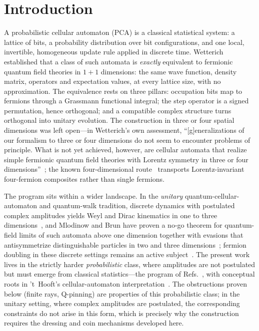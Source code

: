 \documentclass[aps,prd,twocolumn,superscriptaddress,nofootinbib,floatfix]{revtex4-2}
\begin{document}
\section{Introduction}
\label{sec:intro}

A probabilistic cellular automaton (PCA) is a classical statistical system:
a lattice of bits, a probability distribution over bit configurations, and
one local, invertible, homogeneous update rule applied in discrete time.
Wetterich~\cite{Wetterich2022,Wetterich2022b} established that a class of
such automata is \emph{exactly} equivalent to fermionic quantum field
theories in $1+1$ dimensions: the same wave function, density matrix,
operators and expectation values, at every lattice size, with no
approximation. The equivalence rests on three pillars: occupation bits map
to fermions through a Grassmann functional integral; the step operator is a
signed permutation, hence orthogonal; and a compatible complex structure
turns orthogonal into unitary evolution. The construction in three or four
spatial dimensions was left open---in Wetterich's own assessment,
``[g]eneralizations of our formalism to three or four dimensions do
not seem to encounter problems of principle. What is not yet achieved,
however, are cellular automata that realize simple fermionic quantum
field theories with Lorentz symmetry in three or four
dimensions''~\cite{Wetterich2022}; the known four-dimensional
route~\cite{Wetterich2022c} transports Lorentz-invariant four-fermion
composites rather than single fermions.

The program sits within a wider landscape. In the \emph{unitary}
quantum-cellular-automaton and quantum-walk tradition, discrete dynamics
with postulated complex amplitudes yields Weyl and Dirac kinematics in one
to three dimensions~\cite{BialynickiBirula,Meyer,DArianoPerinotti,
BisioDAriano,Arrighi,Farrelly,Kitagawa}, and Mlodinow and Brun have proven
a no-go theorem for quantum-field limits of such automata above one
dimension together with evasions that antisymmetrize distinguishable
particles in two and three dimensions~\cite{MlodinowBrunNoGo,BrunMlodinow2D,
MlodinowBrun3D}; fermion doubling in these discrete settings remains an
active subject~\cite{DoublingQW}. The present work lives in the strictly
harder \emph{probabilistic} class, where amplitudes are not postulated but
must emerge from classical statistics---the program of
Refs.~\cite{Wetterich2021NPB,Wetterich2022,Wetterich2022b,WetterichPotential,
KreuzkampWetterich,Wetterich2025}, with conceptual roots in 't~Hooft's
cellular-automaton interpretation~\cite{tHooft}. The obstructions proven
below (finite rays, Q-pinning) are properties of this probabilistic
class; in the unitary setting, where complex amplitudes are postulated,
the corresponding constraints do not arise in this form, which is
precisely why the construction requires the dressing and coin mechanisms
developed here.
\end{document}

